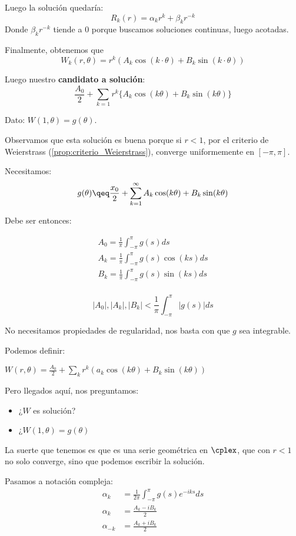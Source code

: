 		Luego la solución quedaría:
		\[ R_k(r) = \alpha_k r^k + \beta_k r^{-k} \]
		Donde $\beta_k r^{-k}$ tiende a 0 porque buscamos soluciones continuas, luego acotadas.

		Finalmente, obtenemos que
		$$W_k(r, \theta) = r^k (A_k \cos(k\cdot \theta) + B_k \sin(k\cdot \theta))$$

		Luego nuestro {\bf candidato a solución}:
		\[\frac{A_0}{2} + \sum_{k=1} r^k \{A_k \cos(k \theta) + B_k \sin(k\theta)\}   \]

		Dato: $W(1,\theta) = g(\theta)$.

		Observamos que esta solución es buena porque si $r<1$, por el criterio de Weierstrass (\ref{prop:criterio_Weierstrass}), converge uniformemente en $[-\pi, \pi]$.

		Necesitamos:
		\[ g(\theta) \qeq \frac{x_0}{2} + \sum_{k = 1}^{\infty} A_k \cos(k \theta) + B_k \sin(k \theta) \]

		Debe ser entonces:

		\[
		\begin{array}{l}
			A_0 = \frac{1}{\pi} \int_{-\pi}^{\pi} g(s) ds \\
			A_k = \frac{1}{\pi} \int_{-\pi}^{\pi} g(s)\cos(ks) ds \\
			B_k = \frac{1}{\pi} \int_{-\pi}^{\pi} g(s) \sin(ks) ds \\
		\end{array}
		\]

		\begin{obs}
			\[ |A_0|, |A_k|, |B_k| < \frac{1}{\pi} \int_{-\pi}^{\pi} |g(s)| ds \]

			No necesitamos propiedades de regularidad, nos basta con que $g$ sea integrable.
		\end{obs}

		Podemos definir:

		\( W(r,\theta) = \frac{A_0}{2} + \sum_k r^k(a_k \cos(k \theta) + B_k \sin(k\theta)) \label{eq:serieW} \)

		Pero llegados aquí, nos preguntamos:

		\begin{itemize}
			\item ¿$W$ es solución?
			\item ¿$W(1, \theta) = g(\theta)$
		\end{itemize}


		La suerte que tenemos es que es una serie geométrica en $\cplex$, que con $r<1$ no solo converge, sino que podemos escribir la solución.

		Pasamos a notación compleja:
		\begin{align*}
			\alpha_k &= \frac{1}{2\pi} \int_{-\pi}^{\pi} g(s) e^{-iks} ds \\
			\alpha_k &= \frac{A_k - iB_k}{2} \\
			\alpha_{-k} &= \frac{A_k + iB_k}{2}
		\end{align*}

